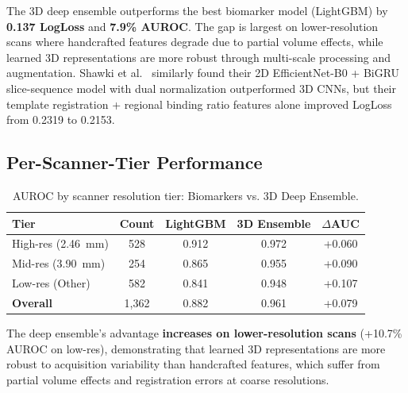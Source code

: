 The 3D deep ensemble outperforms the best biomarker model (LightGBM) by \textbf{0.137 LogLoss} and \textbf{7.9\% AUROC}. The gap is largest on lower-resolution scans where handcrafted features degrade due to partial volume effects, while learned 3D representations are more robust through multi-scale processing and augmentation. Shawki et al.~\cite{shawki2024dat} similarly found their 2D EfficientNet-B0 + BiGRU slice-sequence model with dual normalization outperformed 3D CNNs, but their template registration + regional binding ratio features alone improved LogLoss from 0.2319 to 0.2153.

\subsection{Per-Scanner-Tier Performance}
\label{sec:biomarker_scanner}

\begin{table}[htbp]
\centering
\caption{AUROC by scanner resolution tier: Biomarkers vs. 3D Deep Ensemble.}
\label{tab:biomarker_scanner}
\begin{tabular}{lcccc}
\toprule
\textbf{Tier} & \textbf{Count} & \textbf{LightGBM} & \textbf{3D Ensemble} & \textbf{$\Delta$AUC} \\
\midrule
High-res (2.46~mm) & 528 & 0.912 & 0.972 & +0.060 \\
Mid-res (3.90~mm) & 254 & 0.865 & 0.955 & +0.090 \\
Low-res (Other) & 582 & 0.841 & 0.948 & +0.107 \\
\midrule
\textbf{Overall} & 1,362 & 0.882 & 0.961 & +0.079 \\
\bottomrule
\end{tabular}
\end{table}

The deep ensemble's advantage \textbf{increases on lower-resolution scans} (+10.7\% AUROC on low-res), demonstrating that learned 3D representations are more robust to acquisition variability than handcrafted features, which suffer from partial volume effects and registration errors at coarse resolutions.